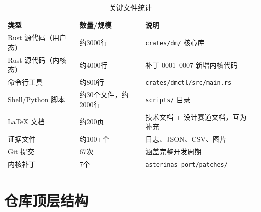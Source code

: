 \begin{table}[H]
    \centering
    \caption{关键文件统计}
    \begin{tabular}{p{}p{}p{}}
        \toprule
        \textbf{类型} & \textbf{数量/规模} & \textbf{说明} \\
        \midrule
        Rust 源代码（用户态） & 约3000行 & \texttt{crates/dm/} 核心库 \\
        Rust 源代码（内核态） & 约4000行 & 补丁 0001--0007 新增内核代码 \\
        命令行工具 & 约800行 & \texttt{crates/dmctl/src/main.rs} \\
        Shell/Python 脚本 & 约30个文件，约2000行 & \texttt{scripts/} 目录 \\
        LaTeX 文档 & 约200页 & 技术文档 + 设计赛道文档，互为补充 \\
        证据文件 & 约100+个 & 日志、JSON、CSV、图片 \\
        Git 提交 & 67次 & 涵盖完整开发周期 \\
        内核补丁 & 7个 & \texttt{asterinas\_port/patches/} \\
        \bottomrule
    \end{tabular}
\end{table}

\section{仓库顶层结构}

